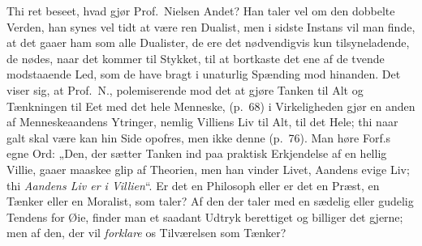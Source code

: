 Thi ret beseet, hvad gjør Prof.\ Nielsen Andet? Han taler vel om den dobbelte
Verden, han synes vel tidt at være ren Dualist, men i sidste Instans vil man
finde, at det gaaer ham som alle Dualister, de ere det nødvendigvis kun
tilsyneladende, de nødes, naar det kommer til Stykket, til at bortkaste det ene
af de tvende modstaaende Led, som de have bragt i
unaturlig Spænding mod hinanden. Det viser sig, at Prof.\ N.,
polemiserende mod det at gjøre Tanken til Alt og Tænkningen til Eet med det
hele Menneske, (p.\ 68) i Virkeligheden gjør en anden af Menneskeaandens
Ytringer, nemlig Villiens Liv til Alt, til det Hele; thi naar galt skal være
kan hin Side opofres, men ikke denne (p.\ 76). Man høre Forf.s egne Ord: „Den,
der sætter Tanken ind paa praktisk Erkjendelse af en hellig Villie, gaaer
maaskee glip af Theorien, men han vinder Livet, Aandens evige Liv; thi
\emph{Aandens Liv er i Villien}“. Er det en Philosoph eller er det en Præst, en
Tænker eller en Moralist, som taler? Af den der taler med en sædelig eller
gudelig Tendens for Øie, finder man et saadant Udtryk berettiget og billiger
det gjerne; men af den, der vil \emph{forklare} os Tilværelsen som Tænker?

